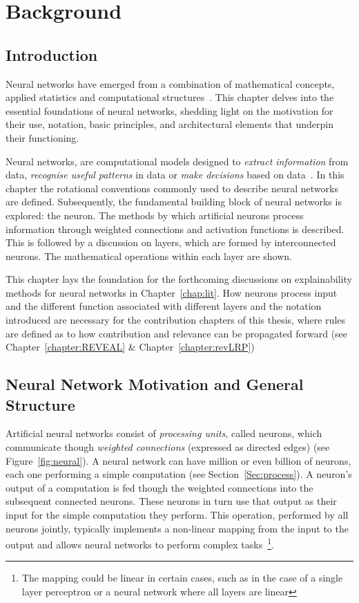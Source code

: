 \chapter{Background}
\label{chap:background}
\section{Introduction}

Neural networks have emerged from a combination of mathematical concepts, applied statistics and computational structures~\cite{du2013neural}. This chapter delves into the essential foundations of neural networks, shedding light on the motivation for their use, notation, basic principles, and architectural elements that underpin their functioning.

Neural networks, are computational models designed to \textit{extract information} from data, \textit{recognise useful patterns} in data or \textit{make decisions} based on data~\cite{basu2010use, perlovsky2001neural}. In this chapter the rotational conventions commonly used to describe neural networks are defined. Subsequently, the fundamental building block of neural networks is explored: the neuron. The methods by which artificial neurons process information through weighted connections and activation functions is described. This is followed by a discussion on layers, which are formed by interconnected neurons. The mathematical operations within each layer are shown.

This chapter lays the foundation for the forthcoming discussions on explainability methods for neural networks in Chapter~\ref{chap:lit}. How neurons process input and the different function associated with different layers and the notation introduced are necessary for the contribution chapters of this thesis, where rules are defined as to how contribution and relevance can be propagated forward (see Chapter~\ref{chapter:REVEAL} \& Chapter~\ref{chapter:revLRP})

\section{Neural Network Motivation and General Structure}

Artificial neural networks consist of \textit{processing units}, called neurons, which communicate though \textit{weighted connections} (expressed as directed edges) (see Figure~\ref{fig:neural}). A neural network can have million or even billion of neurons, each one performing a simple computation (see Section~\ref{Sec:process}). A neuron's output of a computation is fed though the weighted connections into the subsequent connected neurons. These neurons in turn use that output as their input for the simple computation they perform. This operation, performed by all neurons jointly, typically implements a non-linear mapping from the input to the output and allows neural networks to perform complex tasks~\footnote{The mapping could be linear in certain cases, such as in the case of a single layer perceptron or a neural network where all layers are linear}. 

